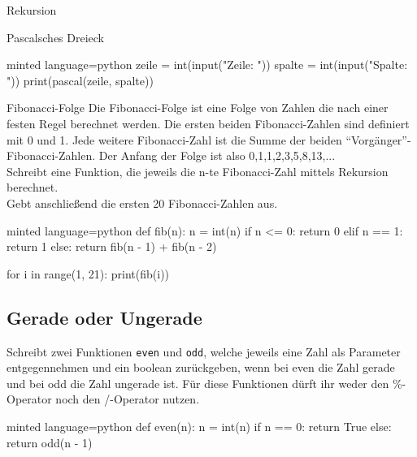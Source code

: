 \begin{task}[points=auto]{Rekursion}
\begin{subtask*}[points=0]{Pascalsches Dreieck }
\begin{solution}
\begin{codeBlock}[]{minted language=python}
                zeile = int(input("Zeile: "))
                spalte = int(input("Spalte: "))
                print(pascal(zeile, spalte))
            \end{codeBlock}
        \end{solution}
    \end{subtask*}
    \begin{subtask*}[points=0]{Fibonacci-Folge }
        Die Fibonacci-Folge ist eine Folge von Zahlen die nach einer festen Regel berechnet werden.
        Die ersten beiden Fibonacci-Zahlen sind definiert mit 0 und 1. Jede weitere Fibonacci-Zahl
        ist die Summe der beiden "`Vorgänger"'-Fibonacci-Zahlen. Der Anfang der Folge ist also 0,1,1,2,3,5,8,13,...\\
        Schreibt eine Funktion, die jeweils die n-te Fibonacci-Zahl mittels Rekursion berechnet.\\
        Gebt anschließend die ersten 20 Fibonacci-Zahlen aus.

        \begin{solution}
            \begin{codeBlock}[]{minted language=python}
                def fib(n):
                    n = int(n)
                    if n <= 0:
                        return 0
                    elif n == 1:
                        return 1
                    else:
                        return fib(n - 1) + fib(n - 2)


                for i in range(1, 21):
                    print(fib(i))
            \end{codeBlock}
        \end{solution}
    \end{subtask*}
    \begin{subtask*}[points=0]{}
        \subsection{Gerade oder Ungerade }
        Schreibt zwei Funktionen \texttt{even} und \texttt{odd}, welche jeweils eine Zahl
        als Parameter entgegennehmen und ein boolean zurückgeben, wenn bei even die Zahl
        gerade und bei odd die Zahl ungerade ist. Für diese Funktionen dürft ihr weder den \%-Operator noch den /-Operator nutzen.

        \begin{solution}
            \begin{codeBlock}[]{minted language=python}
                def even(n):
                    n = int(n)
                    if n == 0:
                        return True
                    else:
                        return odd(n - 1)



\end{codeBlock}
\end{solution}
\end{subtask*}
\end{task}
